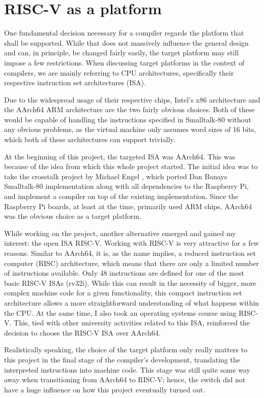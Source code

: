 \chapter{RISC-V as a platform}\label{cha:riscV}

One fundamental decision necessary for a \jit{} compiler regards the platform that shall be supported. 
While that does not massively influence the general design and can, in principle, be changed fairly easily, the target platform may still impose a few restrictions.
When discussing target platforms in the context of compilers, we are mainly referring to CPU architectures, specifically their respective instruction set architectures (ISA).

Due to the widespread usage of their respective chips, Intel's x86 architecture and the AArch64 ARM architecture are the two fairly obvious choices.
Both of these would be capable of handling the instructions specified in Smalltalk-80 without any obvious problems, as the virtual machine only assumes word sizes of 16 bits, which both of these architectures can support trivially.

At the beginning of this project, the targeted ISA was AArch64. This was because of the idea from which this whole project started.
The initial idea was to take the crosstalk project by Michael Engel \cite{crosstalk}, which ported Dan Banays Smalltalk-80 implementation \cite{dbanayST} along with all dependencies to the Raspberry Pi, and implement a \jit{} compiler on top of the existing implementation.
Since the Raspberry Pi boards, at least at the time, primarily used ARM chips, AArch64 was the obvious choice as a target platform. 

While working on the project, another alternative emerged and gained my interest: the open ISA RISC-V.
Working with RISC-V is very attractive for a few reasons. 
Similar to AArch64, it is, as the name implies, a reduced instruction set computer (RISC) architecture, which means that there are only a limited number of instructions available.
Only 48 instructions are defined for one of the most basic RISC-V ISAs (rv32i).
While this can result in the necessity of bigger, more complex machine code for a given functionality, this compact instruction set architecture allows a more straightforward understanding of what happens within the CPU.
At the same time, I also took an operating systems course using RISC-V.
This, tied with other university activities related to this ISA, reinforced the decision to choose the RISC-V ISA over AArch64.

Realistically speaking, the choice of the target platform only really matters to this project in the final stage of the \jit{} compiler's development, translating the interpreted instructions into machine code.
This stage was still quite some way away when transitioning from AArch64 to RISC-V; hence, the switch did not have a huge influence on how this project eventually turned out.
